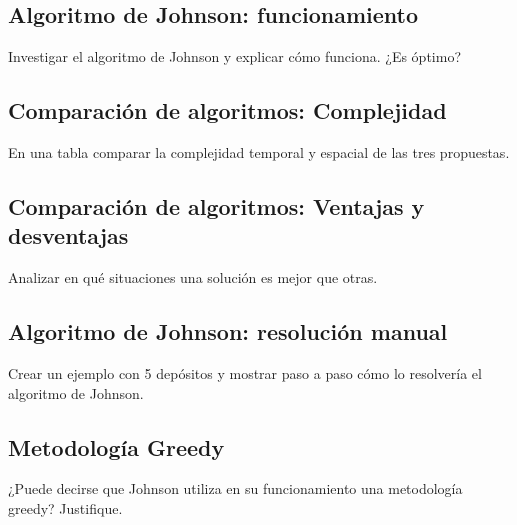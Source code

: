 \documentclass[titlepage,a4paper]{article}
\begin{document}
\newpage\subsection{Algoritmo de Johnson: funcionamiento}\label{sec:parte1_1}
\begin{tcolorbox}[colback=blue!5!white,colframe=blue!75!black,title=Enunciado 1.1]
    Investigar el algoritmo de Johnson y explicar cómo funciona. ¿Es óptimo?
\end{tcolorbox}

\newpage\subsection{Comparación de algoritmos: Complejidad}\label{sec:parte1_2}
\begin{tcolorbox}[colback=blue!5!white,colframe=blue!75!black,title=Enunciado 1.2]
    En una tabla comparar la complejidad temporal y espacial de las tres propuestas.
\end{tcolorbox}

\newpage\subsection{Comparación de algoritmos: Ventajas y desventajas}\label{sec:parte1_3}
\begin{tcolorbox}[colback=blue!5!white,colframe=blue!75!black,title=Enunciado 1.3]
    Analizar en qué situaciones una solución es mejor que otras.
\end{tcolorbox}

\newpage\subsection{Algoritmo de Johnson: resolución manual}\label{sec:parte1_4}
\begin{tcolorbox}[colback=blue!5!white,colframe=blue!75!black,title=Enunciado 1.4]
    Crear un ejemplo con 5 depósitos y mostrar paso a paso cómo lo resolvería el algoritmo de Johnson.
\end{tcolorbox}



\newpage\subsection{Metodología Greedy}\label{sec:parte1_5}
\begin{tcolorbox}[colback=blue!5!white,colframe=blue!75!black,title=Enunciado 1.5]
    ¿Puede decirse que Johnson utiliza en su funcionamiento una metodología greedy? Justifique.
\end{tcolorbox}
\end{document}
